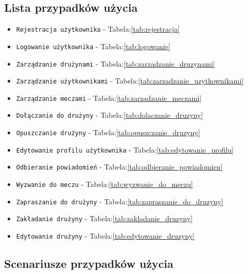 \documentclass[wmii,inf,inz]{uwmthesis} %
\newenvironment{indenteditemize}
{\begin{itemize}[left=1cm]} %
{\end{itemize}}
\begin{document}
\subsection{Lista przypadków użycia}
\begin{indenteditemize}
    \item \texttt{Rejestracja użytkownika} - Tabela:\ref{tab:rejestracja}
    \item \texttt{Logowanie użytkownika} - Tabela:\ref{tab:logowanie}
    \item \texttt{Zarządzanie drużynami} - Tabela:\ref{tab:zarzadzanie_druzynami}
    \item \texttt{Zarządzanie użytkownikami} - Tabela:\ref{tab:zarzadzanie_uzytkownikami}
    \item \texttt{Zarządzanie meczami} - Tabela:\ref{tab:zarzadzanie_meczami}
    \item \texttt{Dołączanie do drużyny} - Tabela:\ref{tab:dolaczanie_druzyny}
    \item \texttt{Opuszczanie drużyny} - Tabela:\ref{tab:opuszczanie_druzyny}
    \item \texttt{Edytowanie profilu użytkownika} - Tabela:\ref{tab:edytowanie_profilu}
    \item \texttt{Odbieranie powiadomień} - Tabela:\ref{tab:odbieranie_powiadomien}
    \item \texttt{Wyzwanie do meczu} - Tabela:\ref{tab:wyzwanie_do_meczu}
    \item \texttt{Zapraszanie do drużyny} - Tabela:\ref{tab:zapraszanie_do_druzyny}
    \item \texttt{Zakładanie drużyny} - Tabela:\ref{tab:zakladanie_druzyny}
    \item \texttt{Edytowanie drużyny} - Tabela:\ref{tab:edytowanie_druzyny}
\end{indenteditemize}
\subsection{Scenariusze przypadków użycia}
\end{document}
